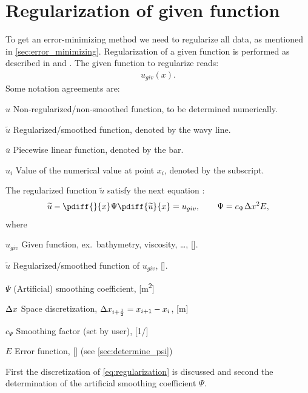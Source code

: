 \section{Regularization of given function}
To get an error-minimizing method we need to regularize all data, as mentioned in \autoref{sec:error_minimizing}.
Regularization of a given function is performed as described in \citet{Borsboom1998} and \citet{Borsboom2003}.
The given function to regularize reads:
\begin{align}
    u_{giv}(x).
\end{align}
Some notation agreements are:
\begin{symbollist}
    \item[$u$] Non-regularized/non-smoothed function, to be determined numerically.
    \item[$\widetilde u$] Regularized/smoothed function, denoted by the wavy line.
    \item[$\overline u$] Piecewise linear function, denoted by the bar.
    \item[$u_i$] Value of the numerical value at point $x_i$, denoted by the subscript.
\end{symbollist}

The regularized function $\widetilde u$ satisfy the next equation \citep[eq.\ 6]{Borsboom1998}:
\begin{align}
    \widetilde u - \pdiff{}{x} \Psi \pdiff{\widetilde u}{x} = u_{giv}, \qquad \Psi = c_{\Psi}\Delta x^2 E, \label{eq:regularization}
\end{align}
where
\begin{symbollist}
    \item[$u_{giv}$] Given function, ex.\ bathymetry, viscosity, \ldots, [\si{\cdot}].
    \item[$\widetilde u$] Regularized/smoothed function of $u_{giv}$, [\si{\cdot}].
    \item[$\Psi$] (Artificial) smoothing coefficient, [\si{\square\metre}]
    \item[$\Delta x$] Space discretization, $\Delta x_{i+\frac{1}{2}} = x_{i+1} - x_{i}$, [\si{\metre}]
    \item[$c_{\Psi}$] Smoothing factor (set by user), [\si{1/\cdot}]
    \item[$E$] Error function, [\si{\cdot}] (see \autoref{sec:determine_psi})
\end{symbollist}


First the discretization of \autoref{eq:regularization} is discussed and second the determination of the artificial smoothing coefficient $\Psi$.

